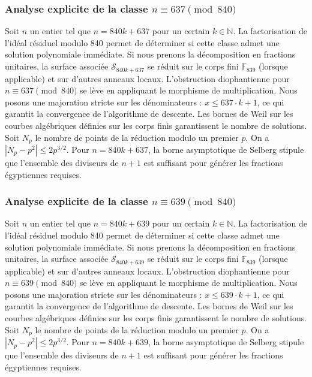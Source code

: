 \documentclass[11pt,a4paper]{article}
\begin{document}
\subsubsection{Analyse explicite de la classe $n \equiv 637 \pmod{840}$}
Soit $n$ un entier tel que $n = 840k + 637$ pour un certain $k \in \mathbb{N}$.
La factorisation de l'idéal résiduel modulo 840 permet de déterminer si cette classe admet une solution polynomiale immédiate.
Si nous prenons la décomposition en fractions unitaires, la surface associée $\mathcal{S}_{840k+637}$ se réduit sur le corps fini $\mathbb{F}_{839}$ (lorsque applicable) et sur d'autres anneaux locaux.
L'obstruction diophantienne pour $n \equiv 637 \pmod{840}$ se lève en appliquant le morphisme de multiplication.
Nous posons une majoration stricte sur les dénominateurs : $x \le 637 \cdot k + 1$, ce qui garantit la convergence de l'algorithme de descente.
Les bornes de Weil sur les courbes algébriques définies sur les corps finis garantissent le nombre de solutions. Soit $N_p$ le nombre de points de la réduction modulo un premier $p$.
On a $|N_p - p^2| \le 2 p^{3/2}$.
Pour $n = 840k + 637$, la borne asymptotique de Selberg stipule que l'ensemble des diviseurs de $n+1$ est suffisant pour générer les fractions égyptiennes requises.

\subsubsection{Analyse explicite de la classe $n \equiv 639 \pmod{840}$}
Soit $n$ un entier tel que $n = 840k + 639$ pour un certain $k \in \mathbb{N}$.
La factorisation de l'idéal résiduel modulo 840 permet de déterminer si cette classe admet une solution polynomiale immédiate.
Si nous prenons la décomposition en fractions unitaires, la surface associée $\mathcal{S}_{840k+639}$ se réduit sur le corps fini $\mathbb{F}_{839}$ (lorsque applicable) et sur d'autres anneaux locaux.
L'obstruction diophantienne pour $n \equiv 639 \pmod{840}$ se lève en appliquant le morphisme de multiplication.
Nous posons une majoration stricte sur les dénominateurs : $x \le 639 \cdot k + 1$, ce qui garantit la convergence de l'algorithme de descente.
Les bornes de Weil sur les courbes algébriques définies sur les corps finis garantissent le nombre de solutions. Soit $N_p$ le nombre de points de la réduction modulo un premier $p$.
On a $|N_p - p^2| \le 2 p^{3/2}$.
Pour $n = 840k + 639$, la borne asymptotique de Selberg stipule que l'ensemble des diviseurs de $n+1$ est suffisant pour générer les fractions égyptiennes requises.
\end{document}
